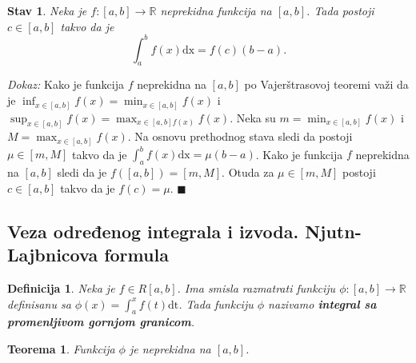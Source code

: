 \documentclass{article}
\newtheorem{definicija}{Definicija}[section]
\newtheorem{teorema}{Teorema}[section]
\newtheorem{stav}{Stav}[section]
\begin{document}
\begin{stavbox}
    \label{stav_2.12}
    \begin{stav}
        Neka je $f: \left[a, b\right] \longrightarrow \mathbb{R}$ neprekidna funkcija na $\left[a, b\right]$. Tada postoji $c\in \left[a,b\right]$ takvo da je
        $$ \int^b_a f\left(x\right)\text{dx} = f\left(c\right)\left(b-a\right).$$
    \end{stav}
\end{stavbox}

\textit{Dokaz:} Kako je funkcija $f$ neprekidna na $\left[a, b\right]$ po Vajerštrasovoj teoremi važi da je $\displaystyle \inf_{x\in\left[a,b\right]} f\left(x\right) = \min_{x \in \left[a, b\right]} f\left(x\right)$ i
$\displaystyle \sup_{x\in\left[a,b\right]} f\left(x\right) = \max_{x \in \left[a, b\right] f\left(x\right)}f\left(x\right)$. Neka su $\displaystyle m = \min_{x\in\left[a,b\right]} f\left(x\right)$ i  $\displaystyle M = \max_{x\in\left[a,b\right]} f\left(x\right)$.
Na osnovu prethodnog stava sledi da postoji $\mu \in \left[m, M\right]$ takvo da je $\displaystyle \int^b_a f\left(x\right) \text{dx} = \mu \left(b-a\right)$. Kako je funkcija $f$ neprekidna
na $\left[a, b\right]$ sledi da je $f\left(\left[a,b\right]\right) = \left[m, M\right]$. Otuda za $\mu \in \left[m, M\right]$ postoji $c \in \left[a, b\right]$ takvo da je $f\left(c\right) = \mu$.
\null\hfill $\blacksquare$\par

\subsection{Veza određenog integrala i izvoda. Njutn-Lajbnicova formula}

\begin{defbox}
    \label{definicija_2.13}
    \begin{definicija}
        Neka je $f \in R\left[a, b\right]$. Ima smisla razmatrati funkciju $\phi:\left[a, b\right] \longrightarrow \mathbb{R}$ definisanu sa $\phi \left(x\right) = \displaystyle \int^x_a f\left(t\right)\text{dt}$. Tada funkciju
        $\phi$ nazivamo \textbf{integral sa promenljivom gornjom granicom}.
    \end{definicija}
\end{defbox}

\begin{teoremabox}
    \label{teorema_2.7}
    \begin{teorema}
        Funkcija $\phi$ je neprekidna na $\left[a, b\right]$.
    \end{teorema}
\end{teoremabox}
\end{document}
